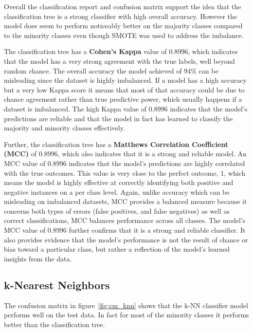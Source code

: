 \documentclass[conference]{IEEEtran}
\begin{document}
Overall the classification report and confusion matrix support the idea that the classification tree is a strong classifier with high overall accuracy. However the model does seem to perform noticeably better on the majority classes compared to the minority classes even though SMOTE was used to address the imbalance.

The classification tree has a \textbf{Cohen's Kappa} value of 0.8996, which indicates that the model has a very strong agreement with the true labels, well beyond random chance. The overall accuracy the model achieved of 94\% can be misleading since the dataset is highly imbalanced. If a model has a high accuracy but a very low Kappa score it means that most of that accuracy could be due to chance agreement rather than true predictive power, which usually happens if a dataset is imbalanced. The high Kappa value of 0.8996 indicates that the model's predictions are reliable and that the model in fact has learned to classify the majority and minority classes effectively.

Further, the classification tree has a \textbf{Matthews Correlation Coefficient (MCC)} of 0.8996, which also indicates that it is a strong and reliable model. An MCC value of 0.8996 indicates that the model's predictions are highly correlated with the true outcomes. This value is very close to the perfect outcome, 1, which means the model is highly effective at correctly identifying both positive and negative instances on a per class level. Again, unlike accuracy which can be misleading on imbalanced datasets, MCC provides a balanced measure because it concerns both types of errors (false positives, and false negatives) as well as correct classifications, MCC balances performance across all classes. The model's MCC value of 0.8996 further confirms that it is a strong and reliable classifier. It also provides evidence that the model's performance is not the result of chance or bias toward a particular class, but rather a reflection of the model's learned insights from the data.

\subsection{\textbf{k-Nearest Neighbors}}

The confusion matrix in figure~\ref{fig:cm_knn} shows that the k-NN classifier model performs well on the test data. In fact for most of the minority classes it performs better than the classification tree.
\end{document}
